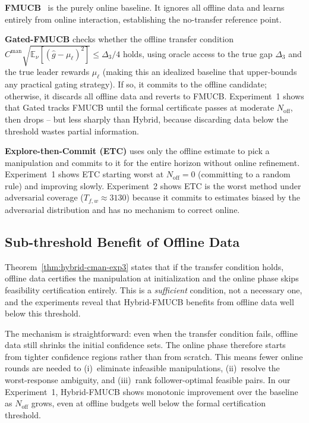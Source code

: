 \documentclass{article}
\newcommand{\E}{\mathbb{E}}           %
\begin{document}
\textbf{FMUCB}~\cite{yu2024decentralized} is the purely online baseline. It ignores all offline data and learns entirely from online interaction, establishing the no-transfer reference point.

\textbf{Gated-FMUCB} checks whether the offline transfer condition $C^{\mathrm{man}}\sqrt{\E_\nu[(\widehat g-\mu_\ell)^2]}\le\Delta_3/4$ holds, using oracle access to the true gap $\Delta_3$ and the true leader rewards $\mu_\ell$ (making this an idealized baseline that upper-bounds any practical gating strategy). If so, it commits to the offline candidate; otherwise, it discards all offline data and reverts to FMUCB. Experiment~1 shows that Gated tracks FMUCB until the formal certificate passes at moderate $N_{\mathrm{off}}$, then drops -- but less sharply than Hybrid, because discarding data below the threshold wastes partial information.

\textbf{Explore-then-Commit (ETC)} uses only the offline estimate to pick a manipulation and commits to it for the entire horizon without online refinement. Experiment~1 shows ETC starting worst at $N_{\mathrm{off}}=0$ (committing to a random rule) and improving slowly. Experiment~2 shows ETC is the worst method under adversarial coverage ($T_{f,w}\approx 3130$) because it commits to estimates biased by the adversarial distribution and has no mechanism to correct online.

\subsection{Sub-threshold Benefit of Offline Data}
\label{app:subthreshold}

Theorem~\ref{thm:hybrid-cman-exp3} states that if the transfer condition holds, offline data certifies the manipulation at initialization and the online phase skips feasibility certification entirely. This is a \emph{sufficient} condition, not a necessary one, and the experiments reveal that Hybrid-FMUCB benefits from offline data well below this threshold.

The mechanism is straightforward: even when the transfer condition fails, offline data still shrinks the initial confidence sets. The online phase therefore starts from tighter confidence regions rather than from scratch. This means fewer online rounds are needed to (i)~eliminate infeasible manipulations, (ii)~resolve the worst-response ambiguity, and (iii)~rank follower-optimal feasible pairs. In our Experiment~1, Hybrid-FMUCB shows monotonic improvement over the baseline as $N_{\mathrm{off}}$ grows, even at offline budgets well below the formal certification threshold.
\end{document}

